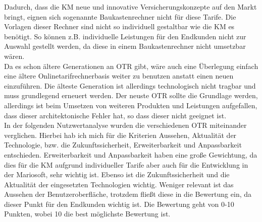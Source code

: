 Dadurch, dass die \ac{KM} neue und innovative Versicherungskonzepte auf den Markt bringt, eignen sich sogenannte Baukastenrechner nicht für diese Tarife. Die Vorlagen dieser Rechner sind nicht so individuell gestaltbar wie die \ac{KM} es benötigt. So können z.B. individuelle Leistungen für den Endkunden nicht zur Auswahl gestellt werden, da diese in einem Baukastenrechner nicht umsetzbar wären.\\
Da es schon ältere Generationen an \ac{OTR} gibt, wäre auch eine Überlegung einfach eine ältere Onlinetarifrechnerbasis weiter zu benutzen anstatt einen neuen einzuführen. Die älteste Generation ist allerdings technologisch nicht tragbar und muss grundlegend erneuert werden. Der neuste \ac{OTR} sollte die Grundlage werden, allerdings ist beim Umsetzen von weiteren Produkten und Leistungen aufgefallen, dass dieser architektonische Fehler hat, so dass dieser nicht geeignet ist.\\
In der folgenden Nutzwertanalyse wurden die verschiedenen \ac{OTR} miteinander verglichen. Hierbei hab ich mich für die Kriterien Aussehen, Aktualität der Technologie, bzw. die Zukunftssicherheit, Erweiterbarkeit und Anpassbarkeit entschieden. Erweiterbarkeit und Anpassbarkeit haben eine große Gewichtung, da dies für die \ac{KM} aufgrund individueller Tarife aber auch für die Entwicklung in der Mariosoft, sehr wichtig ist. Ebenso ist die Zukunftssicherheit und die Aktualität der eingesetzten Technologien wichtig. Weniger relevant ist das Aussehen der Benutzeroberfläche, trotzdem fließt diese in die Bewertung ein, da dieser Punkt für den Endkunden wichtig ist. Die Bewertung geht von 0-10 Punkten, wobei 10 die best möglichste Bewertung ist.\\
\\

